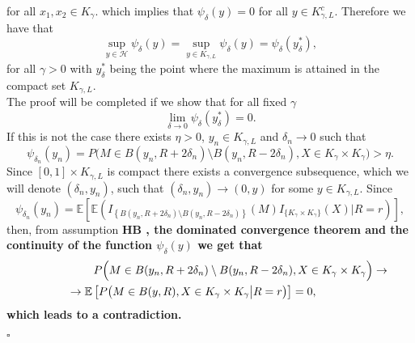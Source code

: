 \documentclass[a4paper]{article}
\newcommand*{\QEDB}{\hfill\ensuremath{\square}}%
\numberwithin{equation}{section}
\begin{document}
\begin{enumerate}[label=(\Alph*)]
for all $x_1, x_2  \in K_{\gamma}$. which implies that $\psi_{\delta}(y)=0$ for all $y \in K^c_{\gamma,L}$. Therefore we have that
$$\sup_{y \in \mathcal{H}} \psi_{\delta}(y) =  \sup_{y \in K_{\gamma,L}}  \psi_{\delta}(y) =  \psi_{\delta}(y^*_{\delta}), $$ 
for all $\gamma >0$ with $y^*_{\delta}$  being the point where the maximum is attained in the compact set  $K_{\gamma,L}$. 
\\  
The proof will be completed if we show that for all fixed $\gamma$  $$\lim_{\delta \to 0} \psi_{\delta}(y^*_{\delta})=0.
$$ If this is not the case there exists $\eta>0$, $y_n \in  K_{\gamma,L}$ and $\delta_n\rightarrow 0$ such that $$\psi_{\delta_n}(y_n)=P \Big( M \in   B(y_n, R + 2\delta_n)   \setminus  B(y_n, R - 2\delta_n), X \in  K_{\gamma} \times K_{\gamma} \Big ) >\eta.$$ Since $ [0,1] \times K_{\gamma,L}$ is compact there exists a convergence subsequence, which we will denote $(\delta_n,y_n)$,  such that $ (\delta_n,y_n) \rightarrow (0,y)$ for some $ y\in K_{\gamma,L}$. %
Since  $$\psi_{\delta_n}(y_n)=\mathbb E\left[ \mathbb E\left(  I_{\left \{B(y_n, R + 2\delta_n)   \setminus  B(y_n, R- 2\delta_n) \right \}} (M)  I_{ \{  K_{\gamma} \times K_{\gamma} \}} (X) \big \vert R=r \right) \right],$$
then, from assumption \bf HB \rm, the dominated convergence theorem and the continuity of the function  $\psi_{\delta}(y)$ we get that 
\begin{align*}
P \Big( M \in   B(y_n, R + 2\delta_n)   \setminus  B(y_n, R- 2\delta_n), X \in  K_{\gamma} \times K_{\gamma} \Big) \to \\
& \hspace{-10 cm} \to \mathbb E\left[  P \big( M \in B(y, R ), X \in  K_{\gamma} \times K_{\gamma}  \big \vert R=r \big ) \right]=0,
\end{align*}
    which leads to a contradiction.




\QEDB
\end{enumerate}
\end{document}
